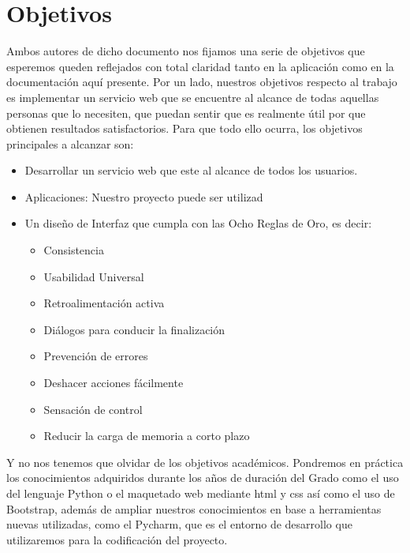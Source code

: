 \section{Objetivos}
Ambos autores de dicho documento nos fijamos una serie de objetivos que esperemos queden reflejados con total claridad tanto en la aplicación como en la documentación aquí presente. Por un lado, nuestros objetivos respecto al trabajo es implementar un servicio web  que se encuentre al alcance de todas aquellas personas que lo necesiten, que puedan sentir que es realmente útil por que obtienen resultados satisfactorios. Para que todo ello ocurra, los objetivos principales a alcanzar son:
\begin{itemize}
	\item Desarrollar un servicio web que este al alcance de todos los usuarios.	
	\item Aplicaciones: Nuestro proyecto puede ser utilizad
	\item Un diseño de Interfaz que cumpla con las Ocho Reglas de Oro, es decir:
	\begin{itemize} 
		\item Consistencia
		\item Usabilidad Universal
		\item Retroalimentación activa
		\item Diálogos para conducir la finalización
		\item Prevención de errores
		\item Deshacer acciones fácilmente
		\item Sensación de control
		\item Reducir la carga de memoria a corto plazo
	\end{itemize}
\end{itemize}
Y no nos tenemos que olvidar de los objetivos académicos. Pondremos en práctica los conocimientos adquiridos durante los años de duración del Grado como el uso del lenguaje Python o el maquetado web mediante html y css así como el uso de Bootstrap, además de ampliar nuestros conocimientos en base a herramientas nuevas utilizadas, como el Pycharm, que es el entorno de desarrollo que utilizaremos para la codificación del proyecto.